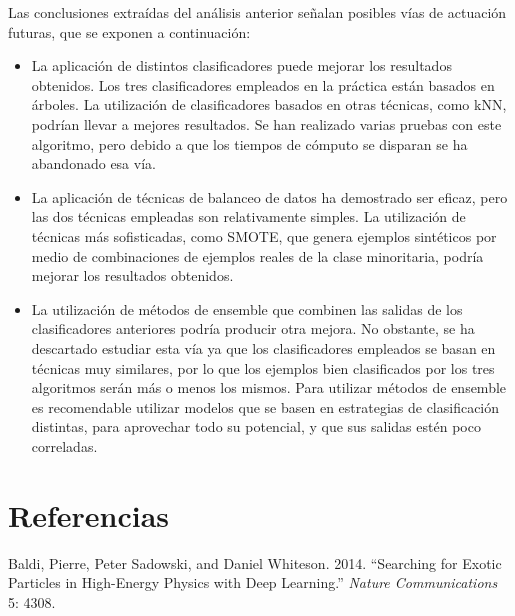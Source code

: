 \documentclass[
  a4paper,
,tablecaptionabove
]{scrartcl}
\providecommand{\tightlist}{%
  \setlength{\itemsep}{0pt}\setlength{\parskip}{0pt}}
\begin{document}
Las conclusiones extraídas del análisis anterior señalan posibles vías
de actuación futuras, que se exponen a continuación:

\begin{itemize}
\tightlist
\item
  La aplicación de distintos clasificadores puede mejorar los resultados
  obtenidos. Los tres clasificadores empleados en la práctica están
  basados en árboles. La utilización de clasificadores basados en otras
  técnicas, como kNN, podrían llevar a mejores resultados. Se han
  realizado varias pruebas con este algoritmo, pero debido a que los
  tiempos de cómputo se disparan se ha abandonado esa vía.
\item
  La aplicación de técnicas de balanceo de datos ha demostrado ser
  eficaz, pero las dos técnicas empleadas son relativamente simples. La
  utilización de técnicas más sofisticadas, como SMOTE, que genera
  ejemplos sintéticos por medio de combinaciones de ejemplos reales de
  la clase minoritaria, podría mejorar los resultados obtenidos.
\item
  La utilización de métodos de ensemble que combinen las salidas de los
  clasificadores anteriores podría producir otra mejora. No obstante, se
  ha descartado estudiar esta vía ya que los clasificadores empleados se
  basan en técnicas muy similares, por lo que los ejemplos bien
  clasificados por los tres algoritmos serán más o menos los mismos.
  Para utilizar métodos de ensemble es recomendable utilizar modelos que
  se basen en estrategias de clasificación distintas, para aprovechar
  todo su potencial, y que sus salidas estén poco correladas.
\end{itemize}

\hypertarget{referencias}{%
\section*{Referencias}\label{referencias}}

\hypertarget{refs}{}
\leavevmode\hypertarget{ref-baldi2014searching}{}%
Baldi, Pierre, Peter Sadowski, and Daniel Whiteson. 2014. ``Searching
for Exotic Particles in High-Energy Physics with Deep Learning.''
\emph{Nature Communications} 5: 4308.
\end{document}
